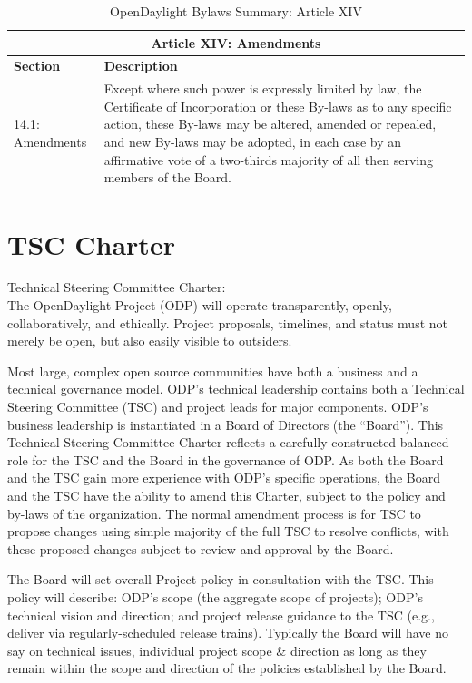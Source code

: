 \documentclass[a4paper, 12pt]{book}
\begin{document}
\begin{table}[H]
  \begin{center}
    \begin{tabular}{ | p{3cm} | p{12cm} | }
    \toprule
    \multicolumn {2}{|c|}{\textbf{Article XIV: Amendments}} \\
    \hline
    \textbf{Section} & \textbf{Description} \\
    \hline
    14.1: Amendments & Except where such power is expressly limited by law, the Certificate of Incorporation or these By-laws as to any specific action, these By-laws may be altered, amended or repealed, and new By-laws may be adopted, in each case by an affirmative vote of a two-thirds majority of all then serving members of the Board.\\
    \bottomrule
    \end{tabular}
    \caption{OpenDaylight Bylaws Summary: Article XIV}
    \label{tab:odlbylaws-art14}
  \end{center}
\end{table}

\chapter{TSC Charter}
\label{chap:appendix_tsccharter}
Technical Steering Committee Charter:\\
The OpenDaylight Project (ODP) will operate transparently, openly, collaboratively, and ethically.  Project proposals, timelines, and status must not merely be open, but also easily visible to outsiders.

Most large, complex open source communities have both a business and a technical governance model.  ODP's technical leadership contains both a Technical Steering Committee (TSC) and project leads for major components.  ODP's business leadership is instantiated in a Board of Directors (the “Board”).  This Technical Steering Committee Charter reflects a carefully constructed balanced role for the TSC and the Board in the governance of ODP.  As both the Board and the TSC gain more experience with ODP’s specific operations, the Board and the TSC have the ability to amend this Charter, subject to the policy and by-laws of the organization.  The normal amendment process is for TSC to propose changes using simple majority of the full TSC to resolve conflicts, with these proposed changes subject to review and approval by the Board.

The Board will set overall Project policy in consultation with the TSC.   This policy will describe:  ODP's scope (the aggregate scope of projects); ODP’s technical vision and direction; and project release guidance to the TSC (e.g., deliver via regularly-scheduled release trains).   Typically the Board will have no say on technical issues, individual project scope \& direction as long as they remain within the scope and direction of the policies established by the Board.
\end{document}
